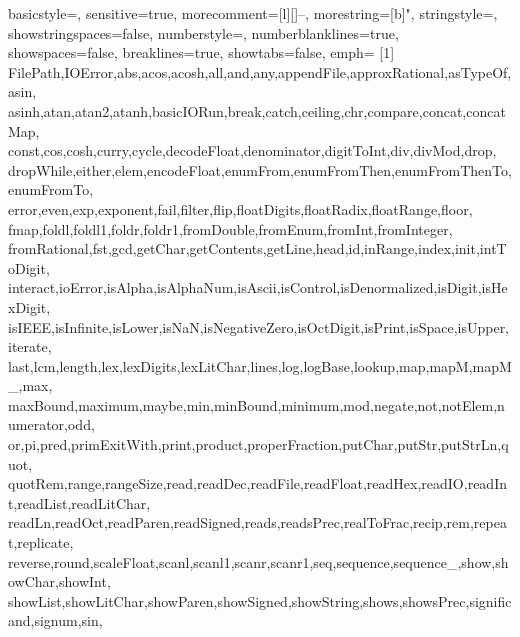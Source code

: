 \usepackage{listings}


\ifdefined\withcolor
\else
\fi


\def\codesize{\normalsize}

 {
	basicstyle=\ttfamily\footnotesize,
	sensitive=true,
	morecomment=[l][\color{gray_ulisses}\ttfamily\codesize]{--},
	morestring=[b]",
	stringstyle=\color{haskellred},
	showstringspaces=false,
	numberstyle=\codesize,
	numberblanklines=true,
	showspaces=false,
	breaklines=true,
	showtabs=false,
	emph=
	{[1]
		FilePath,IOError,abs,acos,acosh,all,and,any,appendFile,approxRational,asTypeOf,asin,
		asinh,atan,atan2,atanh,basicIORun,break,catch,ceiling,chr,compare,concat,concatMap,
		const,cos,cosh,curry,cycle,decodeFloat,denominator,digitToInt,div,divMod,drop,
		dropWhile,either,elem,encodeFloat,enumFrom,enumFromThen,enumFromThenTo,enumFromTo,
		error,even,exp,exponent,fail,filter,flip,floatDigits,floatRadix,floatRange,floor,
		fmap,foldl,foldl1,foldr,foldr1,fromDouble,fromEnum,fromInt,fromInteger,
		fromRational,fst,gcd,getChar,getContents,getLine,head,id,inRange,index,init,intToDigit,
		interact,ioError,isAlpha,isAlphaNum,isAscii,isControl,isDenormalized,isDigit,isHexDigit,
		isIEEE,isInfinite,isLower,isNaN,isNegativeZero,isOctDigit,isPrint,isSpace,isUpper,iterate,
		last,lcm,length,lex,lexDigits,lexLitChar,lines,log,logBase,lookup,map,mapM,mapM_,max,
		maxBound,maximum,maybe,min,minBound,minimum,mod,negate,not,notElem,numerator,odd,
		or,pi,pred,primExitWith,print,product,properFraction,putChar,putStr,putStrLn,quot,
		quotRem,range,rangeSize,read,readDec,readFile,readFloat,readHex,readIO,readInt,readList,readLitChar,
		readLn,readOct,readParen,readSigned,reads,readsPrec,realToFrac,recip,rem,repeat,replicate,
		reverse,round,scaleFloat,scanl,scanl1,scanr,scanr1,seq,sequence,sequence_,show,showChar,showInt,
		showList,showLitChar,showParen,showSigned,showString,shows,showsPrec,significand,signum,sin,
}}
